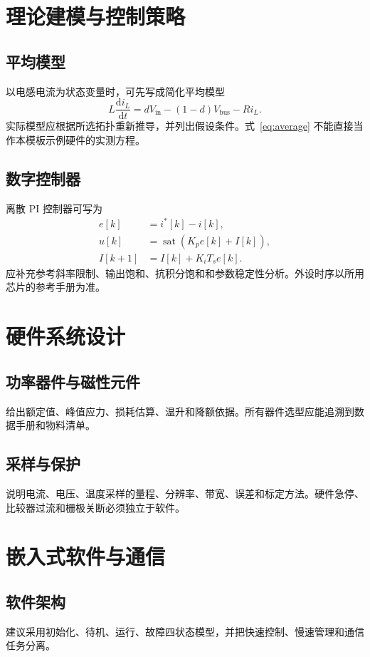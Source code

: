 \documentclass[12pt,a4paper,fontset=fandol,oneside,openany]{ctexbook}
\begin{document}
\chapter{理论建模与控制策略}
\section{平均模型}
以电感电流为状态变量时，可先写成简化平均模型\cite{erickson2020fpe}
\begin{equation}
  L\frac{\mathrm{d}i_{L}}{\mathrm{d}t}
    = dV_{\mathrm{in}}-(1-d)V_{\mathrm{bus}}-Ri_{L}.
  \label{eq:average}
\end{equation}
实际模型应根据所选拓扑重新推导，并列出假设条件。式~\eqref{eq:average} 不能直接当作本模板示例硬件的实测方程。

\section{数字控制器}
离散 PI 控制器可写为
\begin{align}
  e[k] &= i^{*}[k]-i[k],\\
  u[k] &= \operatorname{sat}\left(K_{p}e[k]+I[k]\right),\\
  I[k+1] &= I[k]+K_{i}T_{s}e[k].
\end{align}
应补充参考斜率限制、输出饱和、抗积分饱和和参数稳定性分析。外设时序以所用芯片的参考手册为准\cite{stm32f103rm}。

\chapter{硬件系统设计}
\section{功率器件与磁性元件}
给出额定值、峰值应力、损耗估算、温升和降额依据。所有器件选型应能追溯到数据手册和物料清单。

\section{采样与保护}
说明电流、电压、温度采样的量程、分辨率、带宽、误差和标定方法。硬件急停、比较器过流和栅极关断必须独立于软件。

\chapter{嵌入式软件与通信}
\section{软件架构}
建议采用初始化、待机、运行、故障四状态模型，并把快速控制、慢速管理和通信任务分离。
\end{document}
